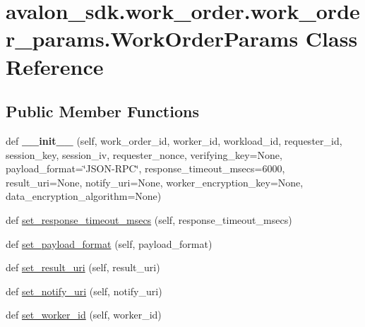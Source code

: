 \hypertarget{classavalon__sdk_1_1work__order_1_1work__order__params_1_1WorkOrderParams}{}\section{avalon\+\_\+sdk.\+work\+\_\+order.\+work\+\_\+order\+\_\+params.\+Work\+Order\+Params Class Reference}
\label{classavalon__sdk_1_1work__order_1_1work__order__params_1_1WorkOrderParams}
\subsection*{Public Member Functions}
\begin{DoxyCompactItemize}
\item 
\mbox{\label{classavalon__sdk_1_1work__order_1_1work__order__params_1_1WorkOrderParams_ab468eca6e23003d09690cf6653b1d8b4}} 
def {\bfseries \+\_\+\+\_\+init\+\_\+\+\_\+} (self, work\+\_\+order\+\_\+id, worker\+\_\+id, workload\+\_\+id, requester\+\_\+id, session\+\_\+key, session\+\_\+iv, requester\+\_\+nonce, verifying\+\_\+key=None, payload\+\_\+format=\char`\"{}J\+S\+ON-\/R\+PC\char`\"{}, response\+\_\+timeout\+\_\+msecs=6000, result\+\_\+uri=None, notify\+\_\+uri=None, worker\+\_\+encryption\+\_\+key=None, data\+\_\+encryption\+\_\+algorithm=None)
\item 
def \hyperlink{classavalon__sdk_1_1work__order_1_1work__order__params_1_1WorkOrderParams_a8383bf79fc66ddd26b8fec80e37c88a6}{set\+\_\+response\+\_\+timeout\+\_\+msecs} (self, response\+\_\+timeout\+\_\+msecs)
\item 
def \hyperlink{classavalon__sdk_1_1work__order_1_1work__order__params_1_1WorkOrderParams_ab0245ea466a1b65d7bfdb5d5d12c0c78}{set\+\_\+payload\+\_\+format} (self, payload\+\_\+format)
\item 
def \hyperlink{classavalon__sdk_1_1work__order_1_1work__order__params_1_1WorkOrderParams_aaf84f7fa3bbaff1de72eb73282aa0ee1}{set\+\_\+result\+\_\+uri} (self, result\+\_\+uri)
\item 
def \hyperlink{classavalon__sdk_1_1work__order_1_1work__order__params_1_1WorkOrderParams_a3843b515528469913607abc922f36504}{set\+\_\+notify\+\_\+uri} (self, notify\+\_\+uri)
\item 
def \hyperlink{classavalon__sdk_1_1work__order_1_1work__order__params_1_1WorkOrderParams_a57799aaf5117fcecad92cd84557c1cee}{set\+\_\+worker\+\_\+id} (self, worker\+\_\+id)

\end{DoxyCompactItemize}
